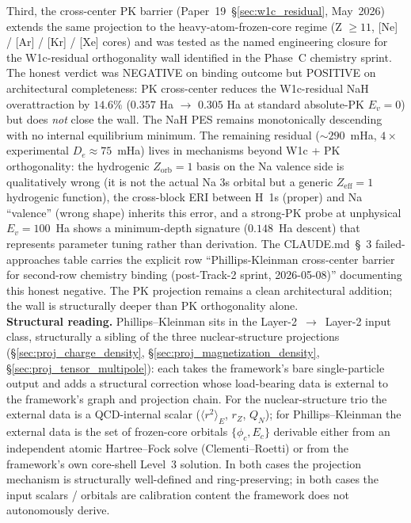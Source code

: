 Third, the cross-center PK barrier
(Paper~19~\S\ref{sec:w1c_residual}, May~2026) extends the same
projection to the heavy-atom-frozen-core regime
(Z $\geq 11$, [Ne] / [Ar] / [Kr] / [Xe] cores) and was tested as the
named engineering closure for the W1c-residual orthogonality wall
identified in the Phase~C chemistry sprint.  The honest verdict was
NEGATIVE on binding outcome but POSITIVE on architectural completeness:
PK cross-center reduces the W1c-residual NaH overattraction by
$14.6\%$ ($0.357$ Ha $\to$ $0.305$ Ha at standard absolute-PK
$E_v = 0$) but does \emph{not} close the wall.  The NaH PES remains
monotonically descending with no internal equilibrium minimum.  The
remaining residual ($\sim 290$~mHa, $4\times$ experimental
$D_e \approx 75$~mHa) lives in mechanisms beyond W1c + PK orthogonality:
the hydrogenic $Z_\text{orb} = 1$ basis on the Na valence side is
qualitatively wrong (it is not the actual Na 3s orbital but a generic
$Z_\text{eff} = 1$ hydrogenic function), the cross-block ERI between
H~1s (proper) and Na ``valence'' (wrong shape) inherits this error,
and a strong-PK probe at unphysical $E_v = 100$~Ha shows a
minimum-depth signature ($0.148$~Ha descent) that represents parameter
tuning rather than derivation.  The CLAUDE.md~\S~3 failed-approaches
table carries the explicit row ``Phillips-Kleinman cross-center
barrier for second-row chemistry binding (post-Track-2 sprint,
2026-05-08)'' documenting this honest negative.  The PK projection
remains a clean architectural addition; the wall is structurally
deeper than PK orthogonality alone.\\
\textbf{Structural reading.}  Phillips--Kleinman sits in the
Layer-2~$\to$~Layer-2 input class, structurally a sibling of the three
nuclear-structure projections (\S\ref{sec:proj_charge_density},
\S\ref{sec:proj_magnetization_density}, \S\ref{sec:proj_tensor_multipole}):
each takes the framework's bare single-particle output and adds a
structural correction whose load-bearing data is external to the
framework's graph and projection chain.  For the nuclear-structure
trio the external data is a QCD-internal scalar
($\langle r^2\rangle_E$, $r_Z$, $Q_N$); for Phillips--Kleinman the
external data is the set of frozen-core orbitals
$\{\phi_c, E_c\}$ derivable either from an independent atomic
Hartree--Fock solve (Clementi--Roetti) or from the framework's own
core-shell Level~3 solution.  In both cases the projection mechanism
is structurally well-defined and ring-preserving; in both cases the
input scalars / orbitals are calibration content the framework does
not autonomously derive.

